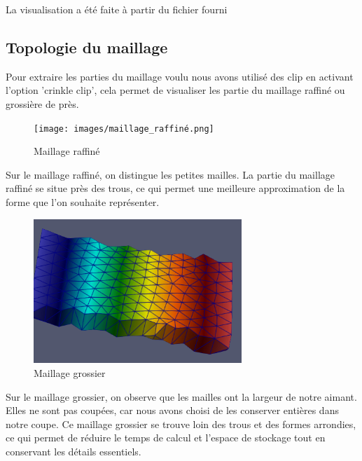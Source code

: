\documentclass{article}
\begin{document}
La visualisation a été faite à partir du fichier fourni 

\subsection{Topologie du maillage}

Pour extraire les parties du maillage voulu nous avons utilisé des clip en activant l'option 'crinkle clip', 
cela permet de visualiser les partie du maillage raffiné ou grossière de près.

\begin{figure}[H]
    \centering
    \texttt{[image: images/maillage\_raffiné.png]}
    \caption{Maillage raffiné}
\end{figure}

Sur le maillage raffiné, on distingue les petites mailles. 
La partie du maillage raffiné se situe près des trous, 
ce qui permet une meilleure approximation de la forme que l'on souhaite représenter.

\begin{figure}[H]
    \centering
    \includegraphics[width=0.7\textwidth]{images/maillage_grossier.png}
    \caption{Maillage grossier}
\end{figure}

Sur le maillage grossier, on observe que les mailles ont la largeur de notre aimant. 
Elles ne sont pas coupées, car nous avons choisi de les conserver entières dans notre coupe. 
Ce maillage grossier se trouve loin des trous et des formes arrondies, 
ce qui permet de réduire le temps de calcul et l’espace de stockage tout en conservant les détails essentiels.
\end{document}
